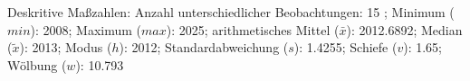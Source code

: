                     \begin{noten}
                	    \note{} Deskritive Maßzahlen:
                	    Anzahl unterschiedlicher Beobachtungen: 15%
                	    ; 
                	      Minimum ($min$): 2008; 
                	      Maximum ($max$): 2025; 
                	      arithmetisches Mittel ($\bar{x}$): \num[round-mode=places,round-precision=2]{2012,6892}; 
                	      Median ($\tilde{x}$): 2013; 
                	      Modus ($h$): 2012; 
                	      Standardabweichung ($s$): \num[round-mode=places,round-precision=2]{1,4255}; 
                	      Schiefe ($v$): \num[round-mode=places,round-precision=2]{1,65}; 
                	      Wölbung ($w$): \num[round-mode=places,round-precision=2]{10,793}
                     \end{noten}


